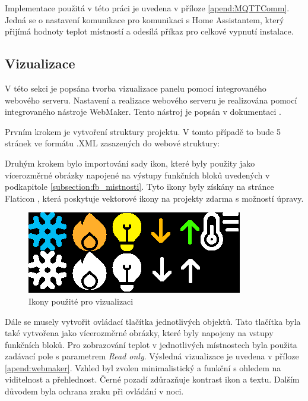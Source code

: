 Implementace použitá v této práci je uvedena v příloze \ref{apend:MQTTComm}. Jedná se o nastavení komunikace pro komunikaci s Home Assistantem, který přijímá hodnoty teplot místností a odesílá příkaz pro celkové vypnutí instalace. 
\subsection{Vizualizace}
V této sekci je popsána tvorba vizualizace panelu pomocí integrovaného webového serveru. Nastavení a realizace webového serveru je realizována pomocí integrovaného nástroje WebMaker. Tento nástroj je popsán v dokumentaci \cite{WebMaker}.

Prvním krokem je vytvoření struktury projektu. V tomto případě to bude 5 stránek ve formátu .XML zasazených do webové struktury: \newline

\vspace{0.3cm}
Druhým krokem bylo importování sady ikon, které byly použity jako vícerozměrné obrázky napojené na výstupy funkčních bloků uvedených v podkapitole \ref{subsection:fb_mistnosti}. Tyto ikony byly získány na stránce Flaticon \cite{Flaticon}, která poskytuje vektorové ikony na projekty zdarma s možností úpravy. 


\begin{figure}[!ht]
    \begin{center}
        \includegraphics[scale=0.6]{obrazky/Ikonky.png}
    \end{center}
    \caption[Ikony použité pro vizualizaci]{Ikony použité pro vizualizaci}
    \label{fig:ikony}
\end{figure}

Dále se musely vytvořit ovládací tlačítka jednotlivých objektů. Tato tlačítka byla také vytvořena jako vícerozměrné obrázky, které byly napojeny na vstupy funkčních bloků. Pro zobrazování teplot v jednotlivých místnostech byla použita zadávací pole s parametrem \textit{Read only}. 
Výsledná vizualizace je uvedena v příloze \ref{apend:webmaker}. Vzhled byl zvolen minimalistický a funkční s ohledem na viditelnost a přehlednost. Černé pozadí zdůrazňuje kontrast ikon a textu. Dalším důvodem byla ochrana zraku při ovládání v noci.